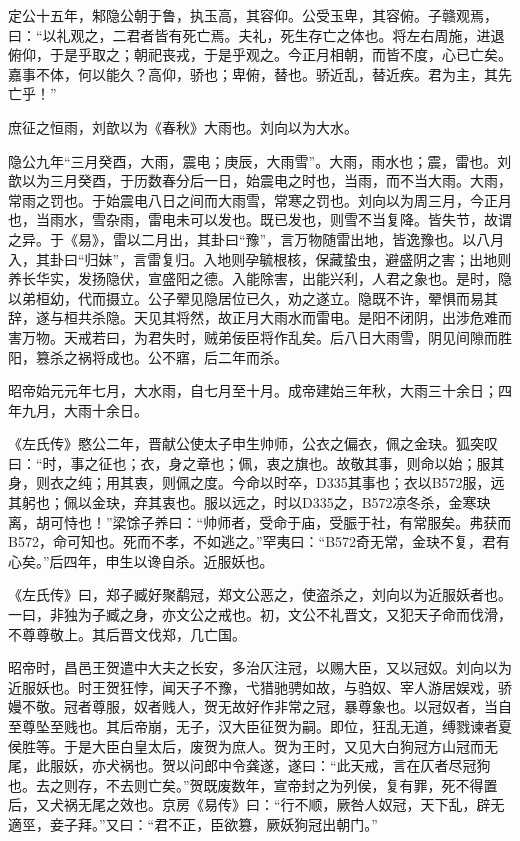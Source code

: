 \documentclass[]{article}
\begin{document}
定公十五年，邾隐公朝于鲁，执玉高，其容仰。公受玉卑，其容俯。子赣观焉，曰：``以礼观之，二君者皆有死亡焉。夫礼，死生存亡之体也。将左右周施，进退俯仰，于是乎取之；朝祀丧戎，于是乎观之。今正月相朝，而皆不度，心已亡矣。嘉事不体，何以能久？高仰，骄也；卑俯，替也。骄近乱，替近疾。君为主，其先亡乎！''

庶征之恒雨，刘歆以为《春秋》大雨也。刘向以为大水。

隐公九年``三月癸酉，大雨，震电；庚辰，大雨雪''。大雨，雨水也；震，雷也。刘歆以为三月癸酉，于历数春分后一日，始震电之时也，当雨，而不当大雨。大雨，常雨之罚也。于始震电八日之间而大雨雪，常寒之罚也。刘向以为周三月，今正月也，当雨水，雪杂雨，雷电未可以发也。既已发也，则雪不当复降。皆失节，故谓之异。于《易》，雷以二月出，其卦曰``豫''，言万物随雷出地，皆逸豫也。以八月入，其卦曰``归妹''，言雷复归。入地则孕毓根核，保藏蛰虫，避盛阴之害；出地则养长华实，发扬隐伏，宣盛阳之德。入能除害，出能兴利，人君之象也。是时，隐以弟桓幼，代而摄立。公子翚见隐居位已久，劝之遂立。隐既不许，翚惧而易其辞，遂与桓共杀隐。天见其将然，故正月大雨水而雷电。是阳不闭阴，出涉危难而害万物。天戒若曰，为君失时，贼弟佞臣将作乱矣。后八日大雨雪，阴见间隙而胜阳，篡杀之祸将成也。公不寤，后二年而杀。

昭帝始元元年七月，大水雨，自七月至十月。成帝建始三年秋，大雨三十余日；四年九月，大雨十余日。

《左氏传》愍公二年，晋献公使太子申生帅师，公衣之偏衣，佩之金玦。狐突叹曰：``时，事之征也；衣，身之章也；佩，衷之旗也。故敬其事，则命以始；服其身，则衣之纯；用其衷，则佩之度。今命以时卒，D335其事也；衣以B572服，远其躬也；佩以金玦，弃其衷也。服以远之，时以D335之，B572凉冬杀，金寒玦离，胡可恃也！''梁馀子养曰：``帅师者，受命于庙，受脤于社，有常服矣。弗获而B572，命可知也。死而不孝，不如逃之。''罕夷曰：``B572奇无常，金玦不复，君有心矣。''后四年，申生以谗自杀。近服妖也。

《左氏传》曰，郑子臧好聚鹬冠，郑文公恶之，使盗杀之，刘向以为近服妖者也。一曰，非独为子臧之身，亦文公之戒也。初，文公不礼晋文，又犯天子命而伐滑，不尊尊敬上。其后晋文伐郑，几亡国。

昭帝时，昌邑王贺遣中大夫之长安，多治仄注冠，以赐大臣，又以冠奴。刘向以为近服妖也。时王贺狂悖，闻天子不豫，弋猎驰骋如故，与驺奴、宰人游居娱戏，骄嫚不敬。冠者尊服，奴者贱人，贺无故好作非常之冠，暴尊象也。以冠奴者，当自至尊坠至贱也。其后帝崩，无子，汉大臣征贺为嗣。即位，狂乱无道，缚戮谏者夏侯胜等。于是大臣白皇太后，废贺为庶人。贺为王时，又见大白狗冠方山冠而无尾，此服妖，亦犬祸也。贺以问郎中令龚遂，遂曰：``此天戒，言在仄者尽冠狗也。去之则存，不去则亡矣。''贺既废数年，宣帝封之为列侯，复有罪，死不得置后，又犬祸无尾之效也。京房《易传》曰：``行不顺，厥咎人奴冠，天下乱，辟无適巠，妾子拜。''又曰：``君不正，臣欲篡，厥妖狗冠出朝门。''
\end{document}
